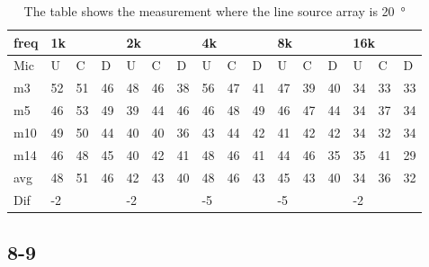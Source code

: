 \begin{table}[H]
\centering
\caption{The table shows the measurement where the line source array is \SI{20}{\degree}}
\begin{tabular}{l|l|l|l|l|l|l|l|l|l|l|l|l|lll}
freq & \multicolumn{3}{l|}{1k} & \multicolumn{3}{l|}{2k} & \multicolumn{3}{l|}{4k} & \multicolumn{3}{l|}{8k} & \multicolumn{3}{l}{16k}                                \\ \hline
Mic  & U      & C      & D     & U      & C      & D     & U      & C      & D     & U      & C      & D     & \multicolumn{1}{l|}{U}  & \multicolumn{1}{l|}{C}  & D  \\ \hline
m3    &  52    &  51    &  46    &  48    &  46    &  38    &   56   &    47   &  41    &  47     &  39    &  40    & \multicolumn{1}{l|}{34} & \multicolumn{1}{l|}{33} &33  \\
m5    &  46    &  53    &  49    &  39    &  44    & 46     &   46   &  48     &  49    &  46     &  47    &   44   & \multicolumn{1}{l|}{34} & \multicolumn{1}{l|}{37} &34  \\
m10  &  49    &  50    &  44    &  40    &   40   &   36   &   43   &   44    &   42   &  41     & 42     & 42     & \multicolumn{1}{l|}{34} & \multicolumn{1}{l|}{32} &34  \\
m14  &  46    &  48    &  45    &  40    &  42    &   41   &    48  &  46     &   41   &  44     &  46    &  35    & \multicolumn{1}{l|}{35} & \multicolumn{1}{l|}{41} & 29 \\ \hline
avg & 48     &  51    &  46    &   42   &  43    &  40    &  48    &   46    &  43    &  45     & 43     &  40    & \multicolumn{1}{l|}{34} & \multicolumn{1}{l|}{36}  & 32  \\ \hline  
Dif & \multicolumn{3}{l|}{-2} & \multicolumn{3}{l|}{-2} & \multicolumn{3}{l|}{-5} & \multicolumn{3}{l|}{-5} & \multicolumn{3}{l}{-2}                                
\end{tabular}
\end{table}

\subsection{8-9}

